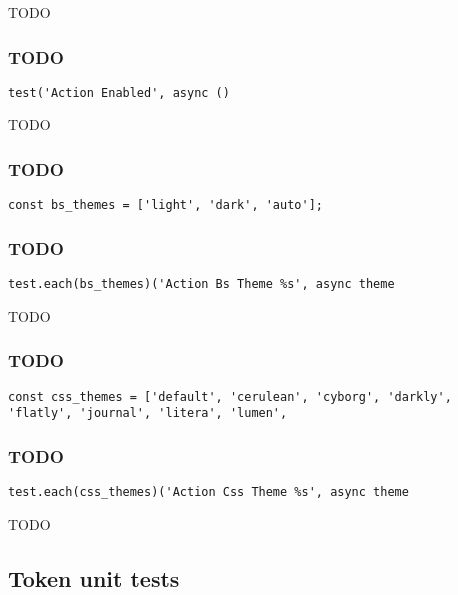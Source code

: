 \documentclass[a4paper]{article}
\begin{document}
TODO

\hypertarget{toc712}{}
\subsubsection{TODO}

\begin{lstlisting}
test('Action Enabled', async ()
\end{lstlisting}

TODO

\hypertarget{toc713}{}
\subsubsection{TODO}

\begin{lstlisting}
const bs_themes = ['light', 'dark', 'auto'];
\end{lstlisting}

\hypertarget{toc714}{}
\subsubsection{TODO}

\begin{lstlisting}
test.each(bs_themes)('Action Bs Theme %s', async theme
\end{lstlisting}

TODO

\hypertarget{toc715}{}
\subsubsection{TODO}

\begin{lstlisting}
const css_themes = ['default', 'cerulean', 'cyborg', 'darkly', 'flatly', 'journal', 'litera', 'lumen',
\end{lstlisting}

\hypertarget{toc716}{}
\subsubsection{TODO}

\begin{lstlisting}
test.each(css_themes)('Action Css Theme %s', async theme
\end{lstlisting}

TODO

\hypertarget{toc717}{}
\subsection{Token unit tests}
\end{document}
